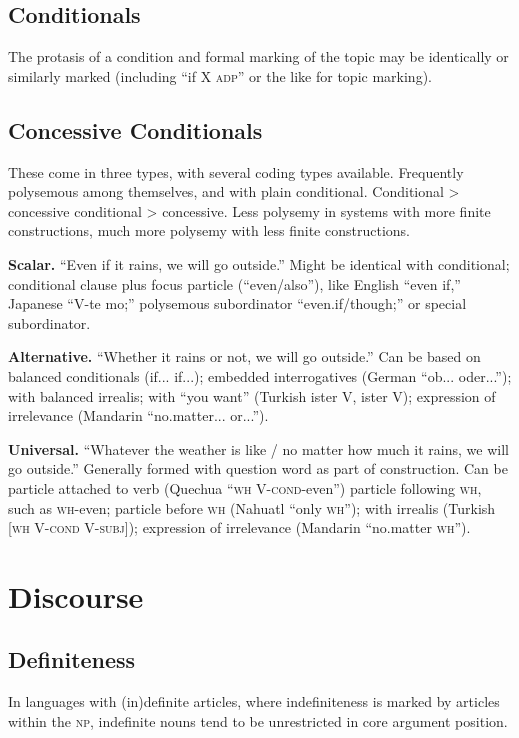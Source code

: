 \documentclass[11pt]{article}
\newcommand{\I}[1]{\textsc{#1}}   %
\begin{document}


\subsection{Conditionals}
The protasis of a condition and formal marking of the topic may be
identically or similarly marked (including ``if X \I{adp}'' or the
like for topic marking).

\subsection{Concessive Conditionals}
These come in three types, with several coding types available.
Frequently polysemous among themselves, and with plain conditional.
Conditional > concessive conditional > concessive.  Less polysemy in
systems with more finite constructions, much more polysemy with less
finite constructions.

\textbf{Scalar.} ``Even if it rains, we will go outside.''  Might be
identical with conditional; conditional clause plus focus particle
(``even/also''), like English ``even if,'' Japanese ``V-te mo;''
polysemous subordinator ``even.if/though;'' or special subordinator.

\textbf{Alternative.} ``Whether it rains or not, we will go outside.''
Can be based on balanced conditionals (if... if...); embedded
interrogatives (German ``ob... oder...''); with balanced irrealis;
with ``you want'' (Turkish ister V, ister V); expression of
irrelevance (Mandarin ``no.matter... or...'').

\textbf{Universal.} ``Whatever the weather is like / no matter how much
it rains, we will go outside.''  Generally formed with question word
as part of construction.  Can be particle attached to verb (Quechua
``\I{wh} V-\I{cond}-even'') particle following \I{wh}, such as
\I{wh}-even; particle before \I{wh} (Nahuatl ``only \I{wh}''); with
irrealis (Turkish [\I{wh V-cond V-subj}]); expression of irrelevance
(Mandarin ``no.matter \I{wh}'').


\section{Discourse}

\subsection{Definiteness}
In languages with (in)definite articles, where indefiniteness is
marked by articles within the \I{np}, indefinite nouns tend to be
unrestricted in core argument position.
\end{document}
